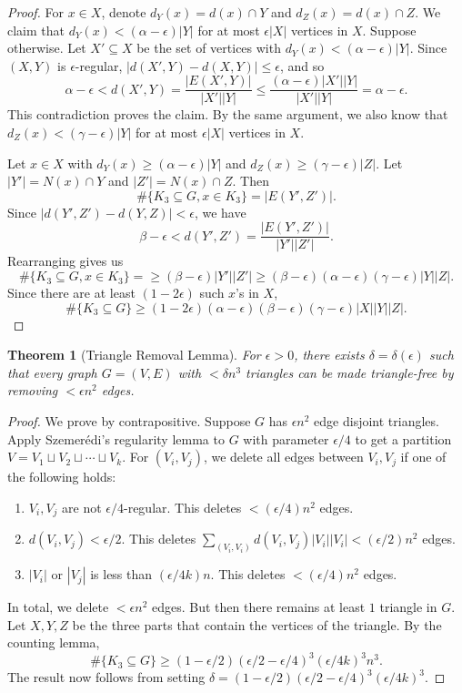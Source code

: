 \documentclass[12pt,reqno]{amsart}
\newtheorem{theorem}{Theorem}[section]
\theoremstyle{definition}
\theoremstyle{remark}
\renewcommand{\leq}{\leqslant}
\renewcommand{\geq}{\geqslant}
\numberwithin{equation}{section}
\begin{document}
\begin{proof}
	For $x \in X$, denote $d_Y(x) = d(x) \cap Y$ and $d_Z(x) = d(x) \cap Z$. We claim that $d_Y(x) < (\alpha - \epsilon)|Y|$ for at most $\epsilon|X|$ vertices in $X$. Suppose otherwise. Let $X' \subseteq X$ be the set of vertices with $d_Y(x) < (\alpha - \epsilon)|Y|$. Since $(X, Y)$ is $\epsilon$-regular, $|d(X', Y) - d(X, Y)| \leq \epsilon$, and so
	\[
		\alpha - \epsilon < d(X', Y) = \frac{|E(X', Y)|}{|X'||Y|} \leq \frac{(\alpha - \epsilon)|X'||Y|}{|X'||Y|} = \alpha - \epsilon.
	\]
	This contradiction proves the claim. By the same argument, we also know that $d_Z(x) < (\gamma - \epsilon)|Y|$ for at most $\epsilon|X|$ vertices in $X$.

	Let $x \in X$ with $d_Y(x) \geq (\alpha - \epsilon)|Y|$ and $d_Z(x) \geq (\gamma - \epsilon)|Z|$. Let $|Y'| = N(x) \cap Y$ and $|Z'| = N(x) \cap Z$. Then
	\[
		\#\{K_3 \subseteq G, x \in K_3\} = |E(Y', Z')|.
	\]
	Since $|d(Y', Z') - d(Y, Z)| < \epsilon$, we have 
	\[
		\beta - \epsilon < d(Y', Z') = \frac{|E(Y', Z')|}{|Y'||Z'|}.
	\]
	Rearranging gives us
	\[
		\#\{K_3 \subseteq G, x \in K_3\} = \geq (\beta - \epsilon)|Y'||Z'| \geq (\beta - \epsilon)(\alpha - \epsilon)(\gamma - \epsilon)|Y||Z|.
	\]
	Since there are at least $(1 - 2\epsilon)$ such $x$'s in $X$,
	\[
		\#\{K_3 \subseteq G\} \geq (1 - 2\epsilon)(\alpha - \epsilon)(\beta - \epsilon)(\gamma - \epsilon)|X||Y||Z|.
	\]
\end{proof}

\begin{theorem}[Triangle Removal Lemma]
	For $\epsilon > 0$, there exists $\delta = \delta(\epsilon)$ such that every graph $G = (V, E)$ with $< \delta n^3$ triangles can be made triangle-free by removing $< \epsilon n^2$ edges.
\end{theorem}

\begin{proof}
	We prove by contrapositive. Suppose $G$ has $\epsilon n^2$ edge disjoint triangles. Apply Szemerédi's regularity lemma to $G$ with parameter $\epsilon/4$ to get a partition $V = V_1 \sqcup V_2 \sqcup \cdots \sqcup V_k$. For $(V_i, V_j)$, we delete all edges between $V_i, V_j$ if one of the following holds:
	\begin{enumerate}
		\item $V_i, V_j$ are not $\epsilon/4$-regular. This deletes $< (\epsilon/4)n^2$ edges.
		\item $d(V_i, V_j) < \epsilon/2$. This deletes $\sum_{(V_i, V_i)} d(V_i, V_j)|V_i||V_i| < (\epsilon/2)n^2$ edges.
		\item $|V_i|$ or $|V_j|$ is less than $(\epsilon/4k)n$. This deletes $< (\epsilon/4)n^2$ edges.
	\end{enumerate}
	In total, we delete $< \epsilon n^2$ edges. But then there remains at least $1$ triangle in $G$. Let $X, Y, Z$ be the three parts that contain the vertices of the triangle. By the counting lemma, 
	\[
		\#\{K_3 \subseteq G\} \geq (1 - \epsilon/2)(\epsilon/2 - \epsilon/4)^3(\epsilon/4k)^3n^3.
	\]
	The result now follows from setting $\delta = (1 - \epsilon/2)(\epsilon/2 - \epsilon/4)^3(\epsilon/4k)^3$.
\end{proof}
\end{document}
